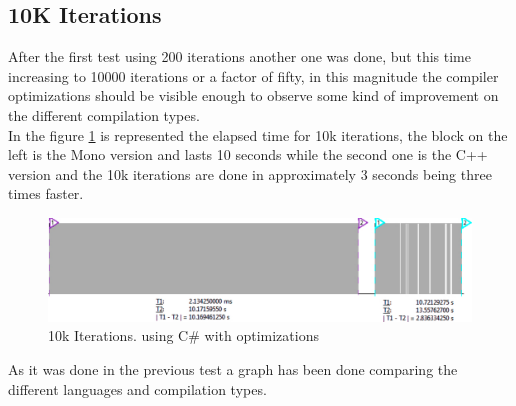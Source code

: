 \subsection{10K Iterations}\label{SS:10K-iterations}
After the first test using 200 iterations another one was done, but this time increasing to 10000 iterations or a factor of fifty, in this magnitude the compiler optimizations should be visible enough to observe some kind of improvement on the different compilation types.
\\
In the figure \ref{fig:gpio-10kit-csharp+cpp} is represented the elapsed time for 10k iterations, the block on the left is the Mono version and lasts 10 seconds while the second one is the C++ version and the 10k iterations are done in approximately 3 seconds being three times faster.
\begin{figure}[H]\begin{center}
 \centering
  \captionsetup{justification=centering}
  \includegraphics[width=1\textwidth]{pictures/performance-tests/GPIO/10k/cxx+csharp}
  \caption{10k Iterations. using C\# with optimizations \label{fig:gpio-10kit-csharp+cpp}}
\end{center}\end{figure}
As it was done in the previous test a graph has been done comparing the different languages and compilation types.

